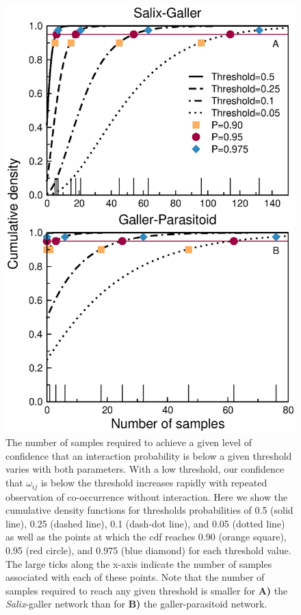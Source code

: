 \documentclass[12pt]{article}
\begin{document}
      \begin{figure}[ht]
        \caption{The number of samples required to achieve a given level of confidence that an interaction probability is below a given threshold varies with both parameters. With a low threshold, our confidence that $\omega_{ij}$ is below the threshold increases rapidly with repeated observation of co-occurrence without interaction. Here we show the cumulative density functions for thresholds probabilities of 0.5 (solid line), 0.25 (dashed line), 0.1 (dash-dot line), and 0.05 (dotted line) as well as the points at which the cdf reaches 0.90 (orange square), 0.95 (red circle), and 0.975 (blue diamond) for each threshold value. The large ticks along the x-axis indicate the number of samples associated with each of these points. Note that the number of samples required to reach any given threshold is smaller for \textbf{A)} the \emph{Salix}-galler network than for \textbf{B)} the galler-parasitoid network.}
        \label{Salix_cdfs}
        \includegraphics[width=.8\textwidth]{figures/Salix_Galler_samples_and_cdfs.eps}

        \end{figure}
\end{document}
